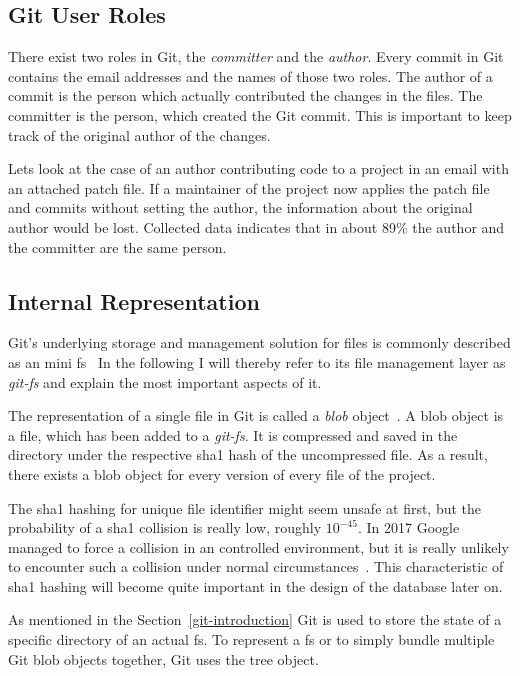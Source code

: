 \subsection{Git User Roles}
There exist two roles in Git, the \emph{committer} and the \emph{author}.
Every commit in Git contains the email addresses and the names of those two roles.
The author of a commit is the person which actually contributed the changes in the files.
The committer is the person, which created the Git commit.
This is important to keep track of the original author of the changes.

Lets look at the case of an author contributing code to a project in an email with an attached patch file.
If a maintainer of the project now applies the patch file and commits without setting the author, the information about the original author would be lost.
Collected data indicates that in about 89\% the author and the committer are the same person.


\subsection{Internal Representation}
Git's underlying storage and management solution for files is commonly described as an mini \ac{fs}~\cite[p.~9]{book:pro-git}
In the following I will thereby refer to its file management layer as \emph{git-fs} and explain the most important aspects of it.

The representation of a single file in Git is called a \emph{blob} object~\cite[p.~56]{book:pro-git}.
A blob object is a file, which has been added to a \emph{git-fs}.
It is compressed and saved in the  directory under the respective \ac{sha1} hash of the uncompressed file.
As a result, there exists a blob object for every version of every file of the project.

The \ac{sha1} hashing for unique file identifier might seem unsafe at first, but the probability of a \ac{sha1} collision is really low, roughly $10^{-45}$.
In 2017 Google managed to force a collision in an controlled environment, but it is really unlikely to encounter such a collision under normal circumstances~\cite{techreport:sha-collision}.
This characteristic of \ac{sha1} hashing will become quite important in the design of the database later on.

As mentioned in the Section~\ref{git-introduction} Git is used to store the state of a specific directory of an actual \ac{fs}.
To represent a \ac{fs} or to simply bundle multiple Git blob objects together, Git uses the tree object.


